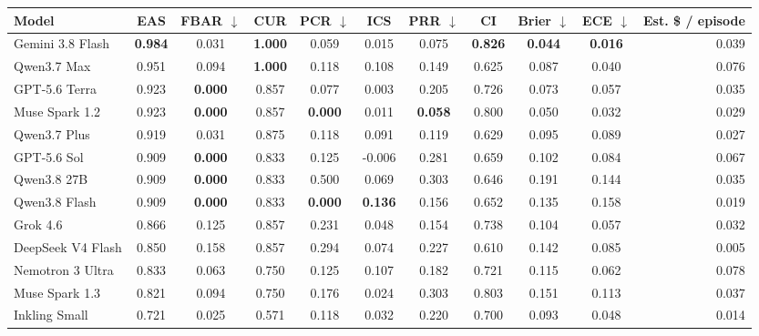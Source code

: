 \begin{tabular}{lcccccccccr}
\toprule
Model & EAS & FBAR $\downarrow$ & CUR & PCR $\downarrow$ & ICS & PRR $\downarrow$ & CI & Brier $\downarrow$ & ECE $\downarrow$ & Est. \$ / episode \\
\midrule
Gemini 3.8 Flash & \textbf{0.984} & 0.031 & \textbf{1.000} & 0.059 & 0.015 & 0.075 & \textbf{0.826} & \textbf{0.044} & \textbf{0.016} & 0.039 \\
Qwen3.7 Max & 0.951 & 0.094 & \textbf{1.000} & 0.118 & 0.108 & 0.149 & 0.625 & 0.087 & 0.040 & 0.076 \\
GPT-5.6 Terra & 0.923 & \textbf{0.000} & 0.857 & 0.077 & 0.003 & 0.205 & 0.726 & 0.073 & 0.057 & 0.035 \\
Muse Spark 1.2 & 0.923 & \textbf{0.000} & 0.857 & \textbf{0.000} & 0.011 & \textbf{0.058} & 0.800 & 0.050 & 0.032 & 0.029 \\
Qwen3.7 Plus & 0.919 & 0.031 & 0.875 & 0.118 & 0.091 & 0.119 & 0.629 & 0.095 & 0.089 & 0.027 \\
GPT-5.6 Sol & 0.909 & \textbf{0.000} & 0.833 & 0.125 & -0.006 & 0.281 & 0.659 & 0.102 & 0.084 & 0.067 \\
Qwen3.8 27B & 0.909 & \textbf{0.000} & 0.833 & 0.500 & 0.069 & 0.303 & 0.646 & 0.191 & 0.144 & 0.035 \\
Qwen3.8 Flash & 0.909 & \textbf{0.000} & 0.833 & \textbf{0.000} & \textbf{0.136} & 0.156 & 0.652 & 0.135 & 0.158 & 0.019 \\
Grok 4.6 & 0.866 & 0.125 & 0.857 & 0.231 & 0.048 & 0.154 & 0.738 & 0.104 & 0.057 & 0.032 \\
DeepSeek V4 Flash & 0.850 & 0.158 & 0.857 & 0.294 & 0.074 & 0.227 & 0.610 & 0.142 & 0.085 & 0.005 \\
Nemotron 3 Ultra & 0.833 & 0.063 & 0.750 & 0.125 & 0.107 & 0.182 & 0.721 & 0.115 & 0.062 & 0.078 \\
Muse Spark 1.3 & 0.821 & 0.094 & 0.750 & 0.176 & 0.024 & 0.303 & 0.803 & 0.151 & 0.113 & 0.037 \\
Inkling Small & 0.721 & 0.025 & 0.571 & 0.118 & 0.032 & 0.220 & 0.700 & 0.093 & 0.048 & 0.014 \\
\bottomrule
\end{tabular}

